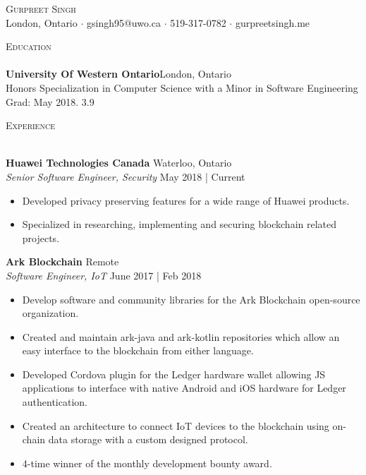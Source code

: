 \documentclass[a4paper]{article}
\newcommand{\lineunder} {
    \vspace*{-8pt} \\
    \hspace*{-18pt} \hrulefill \\
}
\newcommand{\header} [1] {
    {\hspace*{-18pt}\vspace*{6pt} \textsc{#1}}
    \vspace*{-6pt} \lineunder
}
\begin{document}
\vspace*{-40pt}

\vspace*{-10pt}
\begin{center}
	{\Huge \scshape {Gurpreet Singh}}\\
	London, Ontario $\cdot$ gsingh95@uwo.ca $\cdot$ 519-317-0782 $\cdot$ gurpreetsingh.me\\
\end{center}

\vspace*{2mm}

\header{Education}
\textbf{University Of Western Ontario}\hfill London, Ontario\\
Honors Specialization in Computer Science with a Minor in Software Engineering \hfill Grad: May 2018. 3.9\\ 
\vspace{2mm}

\vspace*{2mm}

\header{Experience}
\vspace{1mm}

\textbf{Huawei Technologies Canada} \hfill Waterloo, Ontario\\
\textit{Senior Software Engineer, Security} \hfill May 2018 | Current\\
\vspace{-1mm}
\begin{itemize} \itemsep 1pt
	\item Developed privacy preserving features for a wide range of Huawei products.
	\item Specialized in researching, implementing and securing blockchain related projects.
\end{itemize}

\textbf{Ark Blockchain} \hfill Remote\\
\textit{Software Engineer, IoT} \hfill June 2017 | Feb 2018\\
\vspace{-1mm}
\begin{itemize} \itemsep 1pt
	\item Develop software and community libraries for the Ark Blockchain open-source organization.
	\item Created and maintain ark-java and ark-kotlin repositories which allow an easy interface to the blockchain from either language.
    \item Developed Cordova plugin for the Ledger hardware wallet allowing JS applications to interface with native Android and iOS hardware for Ledger authentication.
    \item Created an architecture to connect IoT devices to the blockchain using on-chain data storage with a custom designed protocol.\\
    \item 4-time winner of the monthly development bounty award.
\end{itemize}
\end{document}
